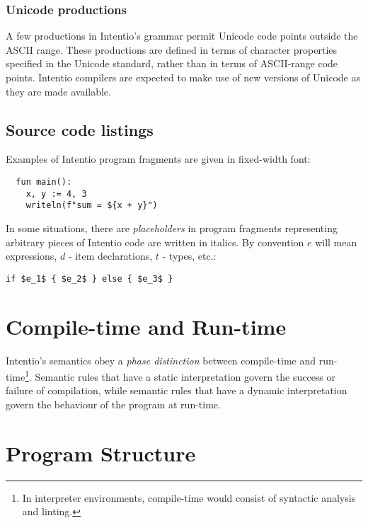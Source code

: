 \subsubsection*{Unicode productions}

A few productions in Intentio's grammar permit Unicode\cite{Unicode6} code points outside the ASCII range. These productions are defined in terms of character properties specified in the Unicode standard, rather than in terms of ASCII-range code points. Intentio compilers are expected to make use of new versions of Unicode as they are made available.

\subsection*{Source code listings}

Examples of Intentio program fragments are given in fixed-width font:

\begin{lstlisting}
  fun main():
    x, y := 4, 3
    writeln(f"sum = ${x + y}")
\end{lstlisting}

In some situations, there are \emph{placeholders} in program fragments representing arbitrary pieces of Intentio code are written in italics. By convention $e$ will mean expressions, $d$ - item declarations, $t$ - types, etc.:

\begin{lstlisting}[mathescape=true]
  if $e_1$ { $e_2$ } else { $e_3$ }
\end{lstlisting}


\section{Compile-time and Run-time}

Intentio's semantics obey a \emph{phase distinction} between compile-time and run-time\footnote{In interpreter environments, compile-time would consist of syntactic analysis and linting.}. Semantic rules that have a static interpretation govern the success or failure of compilation, while semantic rules that have a dynamic interpretation govern the behaviour of the program at run-time.


\section{Program Structure}


